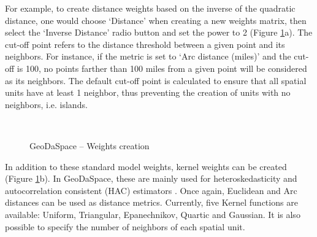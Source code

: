 \documentclass{article}
\begin{document}
For example, to create distance weights based on the inverse of the quadratic distance, one would choose `Distance' when creating a new weights matrix, then select the `Inverse Distance' radio button and set the power to 2 (Figure \ref{f:weights}a). The cut-off point refers to the distance threshold between a given point and its neighbors.  For instance, if the metric is set to `Arc distance (miles)' and the cut-off is 100, no points farther than 100 miles from a given point will be considered as its neighbors. The default cut-off point is calculated to ensure that all spatial units have at least 1 neighbor, thus preventing the creation of units with no neighbors, i.e. islands.

\begin{figure}[htb]
\centering
{} 
 \\
\caption{GeoDaSpace -- Weights creation}
\label{f:weights}
\end{figure}

In addition to these standard model weights, kernel weights can be created (Figure \ref{f:weights}b). In GeoDaSpace, these are mainly used for heteroskedasticity and autocorrelation consistent (HAC) estimators \citet{Kelejian07}. Once again, Euclidean and Arc distances can be used as distance metrics. Currently, five Kernel functions are available: Uniform, Triangular, Epanechnikov, Quartic and Gaussian. It is also possible to specify the number of neighbors of each spatial unit.
\end{document}
